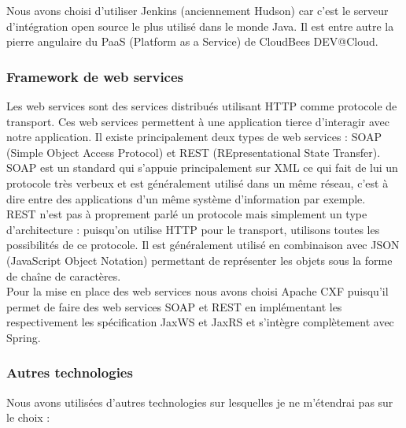 Nous avons choisi d'utiliser Jenkins (anciennement Hudson) car c'est le serveur d'intégration open source le plus utilisé dans le monde Java. Il est entre autre la pierre angulaire du PaaS (Platform as a Service) de CloudBees DEV@Cloud.

\subsubsection{Framework de web services}

Les web services sont des services distribués utilisant HTTP comme protocole de transport. Ces web services permettent à une application tierce d'interagir avec notre application. Il existe principalement deux types de web services : SOAP (Simple Object Access Protocol) et REST (REpresentational State Transfer).\\

SOAP est un standard qui s'appuie principalement sur XML ce qui fait de lui un protocole très verbeux et est généralement utilisé dans un même réseau, c'est à dire entre des applications d'un même système d'information par exemple.\\

REST n'est pas à proprement parlé un protocole mais simplement un type d'architecture : puisqu'on utilise HTTP pour le transport, utilisons toutes les possibilités de ce protocole. Il est généralement utilisé en combinaison avec JSON (JavaScript Object Notation) permettant de représenter les objets sous la forme de chaîne de caractères.\\

Pour la mise en place des web services nous avons choisi Apache CXF puisqu'il permet de faire des web services SOAP et REST en implémentant les respectivement les spécification JaxWS et JaxRS et s'intègre complètement avec Spring.

\subsubsection{Autres technologies}

Nous avons utilisées d'autres technologies sur lesquelles je ne m'étendrai pas sur le choix :

